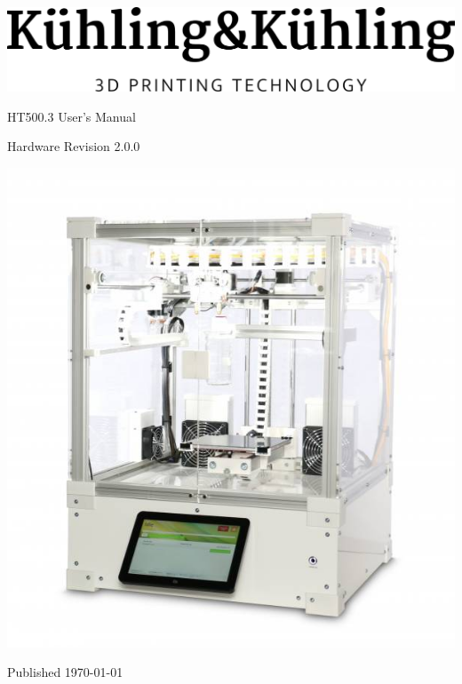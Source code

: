 \documentclass[english, a4paper]{article}
\newcommand{\hardwarerevision}{2.0.0}
\begin{document}

\begin{titlepage}
  \centering
  \includegraphics[width=.2\linewidth]{./img/logo_kuehlingkuehling.png}
  \par\vspace{1cm}
  \par\Huge HT500.3 User's Manual
  \par\vspace{1cm}
  \par\large Hardware Revision \hardwarerevision
  \par\vspace{3cm}
  \includegraphics[width=.7\linewidth]{./img/ht500_freigestellt.jpg}
  \vfill
  \par\large Published \today
\end{titlepage}

\clearpage
\thispagestyle{empty}
\mbox{}
\vfill


\clearpage
{}
\tableofcontents

\clearpage
{}











\clearpage
{}
\renewcommand*{\thepage}{Q-\arabic{page}}

\end{document}
